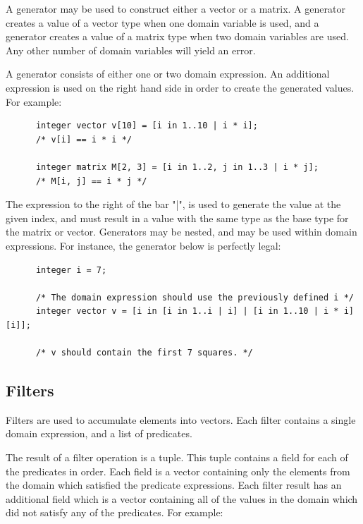 \documentclass{article}
\begin{document}
    A generator may be used to construct either a vector or a matrix. A generator creates a value of a vector type
    when one domain variable is used, and a generator creates a value of a matrix type when two domain variables are
    used.  Any other number of domain variables will yield an error.

    A generator consists of either one or two domain expression. An additional expression is used on the right hand
    side in order to create the generated values. For example:

    \begin{lstlisting}
      integer vector v[10] = [i in 1..10 | i * i];
      /* v[i] == i * i */

      integer matrix M[2, 3] = [i in 1..2, j in 1..3 | i * j];
      /* M[i, j] == i * j */
    \end{lstlisting}

    The expression to the right of the bar "|", is used to generate the value at the given index, and must result in
    a value with the same type as the base type for the matrix or vector. Generators may be nested, and may be used
    within domain expressions. For instance, the generator below is perfectly legal:

    \begin{lstlisting}
      integer i = 7;

      /* The domain expression should use the previously defined i */
      integer vector v = [i in [i in 1..i | i] | [i in 1..10 | i * i][i]];

      /* v should contain the first 7 squares. */
    \end{lstlisting}


  \subsection{Filters}\label{sec:filters}

    Filters are used to accumulate elements into vectors. Each filter contains a single domain expression, and a
    list of predicates.

    The result of a filter operation is a tuple. This tuple contains a field for each of the predicates in order.
    Each field is a vector containing only the elements from the domain which satisfied the predicate expressions.
    Each filter result has an additional field which is a vector containing all of the values in the domain which
    did not satisfy any of the predicates. For example:
\end{document}
